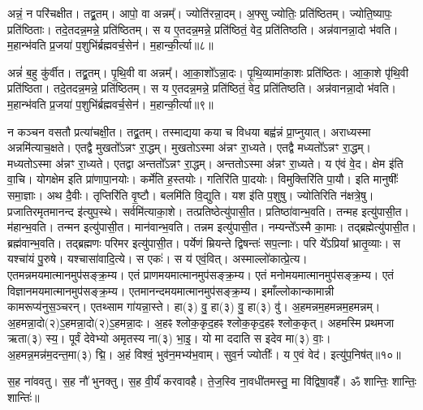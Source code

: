अन्नं॒ न परि॑चक्षीत। 
तद्व्र॒तम्। 
आपो॒ वा अन्नम्᳚। 
ज्योति॑रन्ना॒दम्। 
अ॒फ्सु ज्योतिः॒ प्रति॑\-ष्ठितम्। 
ज्योति॒ष्यापः॒ प्रति॑\-ष्ठिताः। 
तदे॒तदन्न॒मन्ने॒ प्रति॑\-ष्ठितम्। 
स य ए॒तदन्न॒मन्ने॒ प्रति॑\-ष्ठितं॒ वेद॒ प्रति॑\-तिष्ठति। 
अन्न॑वानन्ना॒दो भ॑वति। 
म॒हान्भ॑वति प्र॒जया॑ प॒शुभि॑र्ब्रह्मवर्च॒सेन॑। 
म॒हान्की॒र्त्या॥८॥

अन्नं॑ ब॒हु कु॑र्वीत। 
तद्व्र॒तम्। 
पृ॒थि॒वी वा अन्नम्᳚। 
आ॒का॒शो᳚ऽन्ना॒दः। 
पृ॒थि॒व्यामा॑का॒शः प्रति॑\-ष्ठितः। 
आ॒का॒शे पृ॑थि॒वी प्रति॑\-ष्ठिता। 
तदे॒तदन्न॒मन्ने॒ प्रति॑\-ष्ठितम्। 
स य ए॒तदन्न॒मन्ने॒ प्रति॑\-ष्ठितं॒ वेद॒ प्रति॑\-तिष्ठति। 
अन्न॑वानन्ना॒दो भ॑वति। 
म॒हान्भ॑वति प्र॒जया॑ प॒शुभि॑र्ब्रह्मवर्च॒सेन॑। 
म॒हान्की॒र्त्या॥९॥

न कञ्चन वसतौ प्रत्या॑चक्षी॒त। 
तद्व्र॒तम्। 
तस्माद्यया कया च विधया बह्व॑न्नं प्रा॒प्नुयात्। 
अराध्यस्मा अन्नमि॑त्याच॒क्षते। 
एतद्वै मुखतो᳚ऽन्नꣳ रा॒द्धम्। 
मुखतोऽस्मा अ॑न्नꣳ रा॒ध्यते। 
एतद्वै मध्यतो᳚ऽन्नꣳ रा॒द्धम्। 
मध्यतोऽस्मा अ॑न्नꣳ रा॒ध्यते। 
एतद्वा अन्ततो᳚ऽन्नꣳ रा॒द्धम्। 
अन्ततोऽस्मा अ॑न्नꣳ रा॒ध्यते। 
य ए॑वं वे॒द। 
क्षेम इ॑ति वा॒चि। 
योगक्षेम इति प्रा॑णापा॒नयोः। 
कर्मे॑ति ह॒स्तयोः। 
गतिरि॑ति पा॒दयोः। 
विमुक्तिरि॑ति पा॒यौ। 
इति मानुषीः᳚ समा॒ज्ञाः। 
अथ दै॒वीः। 
तृप्तिरि॑ति वृ॒ष्टौ। 
बलमि॑ति वि॒द्युति। 
यश इ॑ति प॒शुषु। 
ज्योतिरिति न॑क्षत्रे॒षु। 
प्रजातिरमृतमानन्द इ॑त्युप॒स्थे। 
सर्वमि॑त्याका॒शे। 
तत्प्रति\-ष्ठेत्यु॑पासी॒त। 
प्रति\-ष्ठा॑वान्भ॒वति। 
तन्मह इत्यु॑पासी॒त। 
म॑हान्भ॒वति। 
तन्मन इत्यु॑पासी॒त। 
मान॑वान्भ॒वति। 
तन्नम इत्यु॑पासी॒त। 
नम्यन्ते᳚ऽस्मै का॒माः। 
तद्ब्रह्मेत्यु॑पासी॒त। 
ब्रह्म॑वान्भ॒वति। 
तद्ब्रह्मणः परिमर इत्यु॑पासी॒त। 
पर्येणं म्रियन्ते द्विषन्तः॑ सप॒त्नाः। 
परि ये᳚ऽप्रिया᳚ भ्रातृ॒व्याः। 
स यश्चा॑यं पु॒रुषे। 
यश्चासा॑वादि॒त्ये। 
स एकः॑। 
स य॑ एवं॒वित्। 
अस्माल्लो॑कात्प्रे॒त्य। 
एतमन्नमयमात्मानमुप॑सङ्क्र॒म्य। 
एतं प्राणमयमात्मानमुप॑सङ्क्र॒म्य। 
एतं मनोमयमात्मानमुप॑\-सङ्क्र॒म्य। 
एतं विज्ञानमयमात्मानमुप॑\-सङ्क्र॒म्य। 
एतमानन्दमय\-मात्मानमुप॑सङ्क्र॒म्य। 
इमाँल्लोकान्कामान्नी कामरूप्य॑नु\-स॒ञ्चरन्। 
एतथ्साम गा॑यन्ना॒स्ते। 
हा(३) वु॒ हा(३) वु॒ हा(३) वु॑। 
अ॒हमन्नम॒हमन्नम॒हमन्नम्। 
अ॒हमन्ना॒दो(२)\-ऽ॒हमन्ना॒दो(२)\-ऽ॒हमन्ना॒दः। 
अ॒हꣴ श्लोक॒कृद॒हꣴ श्लोक॒कृद॒हꣴ श्लोक॒कृत्। 
अहमस्मि प्रथमजा ऋता(३) स्य॒। 
पूर्वं देवेभ्यो अमृतस्य ना(३) भा॒इ॒। 
यो मा ददाति स इदेव मा(३) वाः॒। 
अ॒हमन्न॒मन्न॑म॒दन्त॒मा(३) द्मि॒। 
अ॒हं विश्वं॒ भुव॑न॒मभ्य॑भ॒वाम्। 
सुव॒र्न ज्योतीः᳚। 
य ए॒वं वेद॑। 
इत्यु॑प॒निष॑त्॥१०॥

स॒ह ना॑ववतु। 
स॒ह नौ॑ भुनक्तु। 
स॒ह वी॒र्यं॑ करवावहै। 
ते॒ज॒स्वि ना॒वधी॑तमस्तु॒ मा वि॑द्विषा॒वहै᳚। 
ॐ शान्तिः॒ शान्तिः॒ शान्तिः॑॥
\closesection


